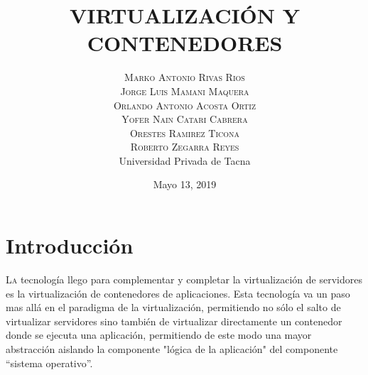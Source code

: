 \documentclass[twoside,twocolumn]{article}
\title{VIRTUALIZACIÓN Y CONTENEDORES} %
\author{%
\textsc{Marko Antonio Rivas Rios} \\[1ex] %
\textsc{Jorge Luis Mamani Maquera} \\[1.01ex] %
\textsc{Orlando Antonio Acosta Ortiz} \\[1.02ex] %
\textsc{Yofer Nain Catari Cabrera} \\[1.03ex] %
\textsc{Orestes Ramirez Ticona} \\[1.04ex] %
\textsc{Roberto Zegarra Reyes} \\[1.05ex] %
\normalsize Universidad Privada de Tacna \\  %
\normalsize {} %
}
\date{Mayo 13, 2019} %
\begin{document}
\maketitle


\section{Introducción}

\lettrine[nindent=0em,lines=2]{L}a tecnología llego para complementar y completar la virtualización de servidores es la
virtualización de contenedores de aplicaciones. Esta tecnología va un paso mas allá en el
paradigma de la virtualización, permitiendo no sólo el salto de virtualizar servidores sino también
de virtualizar directamente un contenedor donde se ejecuta una aplicación, permitiendo de este
modo una mayor abstracción aislando la componente "lógica de la aplicación" del componente
“sistema operativo”.
\end{document}
